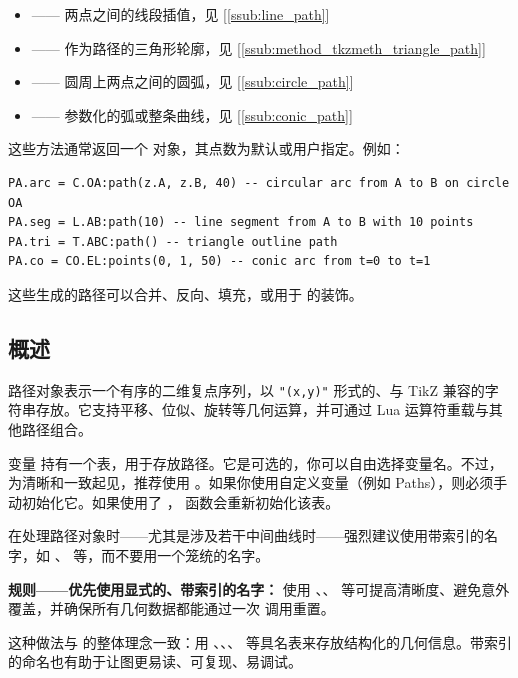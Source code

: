 \begin{itemize}
\item {} —— 两点之间的线段插值，见 [\ref{ssub:line_path}]
\item {} —— 作为路径的三角形轮廓，见 [\ref{ssub:method_tkzmeth_triangle_path}]
\item {} —— 圆周上两点之间的圆弧，见 [\ref{ssub:circle_path}]
\item {} —— 参数化的弧或整条曲线，见 [\ref{ssub:conic_path}]
\end{itemize}

这些方法通常返回一个  对象，其点数为默认或用户指定。例如：

\begin{verbatim}
PA.arc = C.OA:path(z.A, z.B, 40) -- circular arc from A to B on circle OA
PA.seg = L.AB:path(10) -- line segment from A to B with 10 points
PA.tri = T.ABC:path() -- triangle outline path
PA.co = CO.EL:points(0, 1, 50) -- conic arc from t=0 to t=1
\end{verbatim}

这些生成的路径可以合并、反向、填充，或用于 \TIKZ{} 的装饰。


\subsection{概述}

路径对象表示一个有序的二维复点序列，以 \texttt{"(x,y)"} 形式的、与 TikZ 兼容的字符串存放。它支持平移、位似、旋转等几何运算，并可通过 Lua 运算符重载与其他路径组合。

变量  持有一个表，用于存放路径。它是可选的，你可以自由选择变量名。不过，为清晰和一致起见，推荐使用 。如果你使用自定义变量（例如 Paths），则必须手动初始化它。如果使用了 ， 函数会重新初始化该表。

在处理路径对象时——尤其是涉及若干中间曲线时——强烈建议使用带索引的名字，如 、 等，而不要用一个笼统的名字。

\begin{mybox}
\textbf{规则——优先使用显式的、带索引的名字：}
使用 、、 等可提高清晰度、避免意外覆盖，并确保所有几何数据都能通过一次  调用重置。
\end{mybox}

这种做法与  的整体理念一致：用 、、、 等具名表来存放结构化的几何信息。带索引的命名也有助于让图更易读、可复现、易调试。



